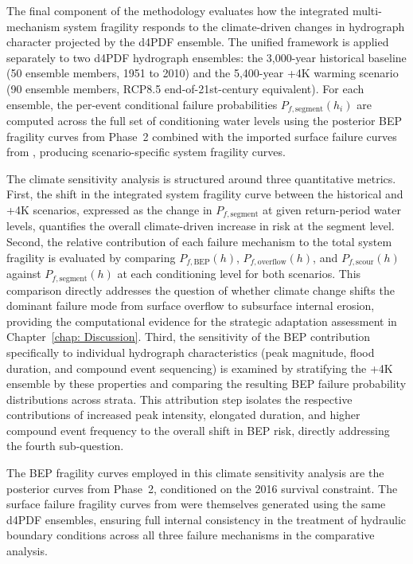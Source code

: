 The final component of the methodology evaluates how the integrated multi-mechanism system fragility responds to the climate-driven changes in hydrograph character projected by the d4PDF ensemble. The unified framework is applied separately to two d4PDF hydrograph ensembles: the 3,000-year historical baseline (50 ensemble members, 1951 to 2010) and the 5,400-year +4K warming scenario (90 ensemble members, RCP8.5 end-of-21st-century equivalent). For each ensemble, the per-event conditional failure probabilities $P_{f,\mathrm{segment}}(h_i)$ are computed across the full set of conditioning water levels using the posterior BEP fragility curves from Phase~2 combined with the imported surface failure curves from \textcite{uemura_phd_2025}, producing scenario-specific system fragility curves.

The climate sensitivity analysis is structured around three quantitative metrics. First, the shift in the integrated system fragility curve between the historical and +4K scenarios, expressed as the change in $P_{f,\mathrm{segment}}$ at given return-period water levels, quantifies the overall climate-driven increase in risk at the segment level. Second, the relative contribution of each failure mechanism to the total system fragility is evaluated by comparing $P_{f,\mathrm{BEP}}(h)$, $P_{f,\mathrm{overflow}}(h)$, and $P_{f,\mathrm{scour}}(h)$ against $P_{f,\mathrm{segment}}(h)$ at each conditioning level for both scenarios. This comparison directly addresses the question of whether climate change shifts the dominant failure mode from surface overflow to subsurface internal erosion, providing the computational evidence for the strategic adaptation assessment in Chapter~\ref{chap: Discussion}. Third, the sensitivity of the BEP contribution specifically to individual hydrograph characteristics (peak magnitude, flood duration, and compound event sequencing) is examined by stratifying the +4K ensemble by these properties and comparing the resulting BEP failure probability distributions across strata. This attribution step isolates the respective contributions of increased peak intensity, elongated duration, and higher compound event frequency to the overall shift in BEP risk, directly addressing the fourth sub-question.

The BEP fragility curves employed in this climate sensitivity analysis are the posterior curves from Phase~2, conditioned on the 2016 survival constraint. The surface failure fragility curves from \textcite{uemura_phd_2025} were themselves generated using the same d4PDF ensembles, ensuring full internal consistency in the treatment of hydraulic boundary conditions across all three failure mechanisms in the comparative analysis.
